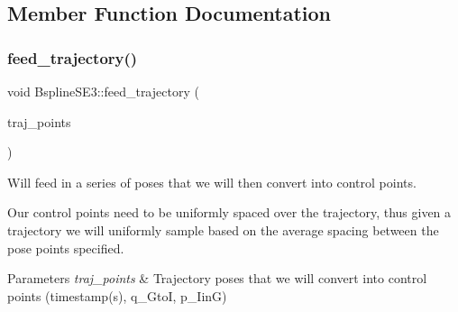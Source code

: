 \subsection{Member Function Documentation}
\mbox{\label{classov__core_1_1BsplineSE3_a2031f15f618b1e4654f5933a987b1cd2}} 
\subsubsection{\texorpdfstring{feed\+\_\+trajectory()}{feed\_trajectory()}}
{\footnotesize\ttfamily void Bspline\+S\+E3\+::feed\+\_\+trajectory (\begin{DoxyParamCaption}\item[{std\+::vector$<$ Eigen\+::\+Vector\+Xd $>$}]{traj\+\_\+points }\end{DoxyParamCaption})}



Will feed in a series of poses that we will then convert into control points. 

Our control points need to be uniformly spaced over the trajectory, thus given a trajectory we will uniformly sample based on the average spacing between the pose points specified.


\begin{DoxyParams}{Parameters}
{\em traj\+\_\+points} & Trajectory poses that we will convert into control points (timestamp(s), q\+\_\+\+GtoI, p\+\_\+\+IinG) \\
\hline
\end{DoxyParams}
\mbox{\label{classov__core_1_1BsplineSE3_af03bc0e8df3f77134afa0a24a425be80}} 
